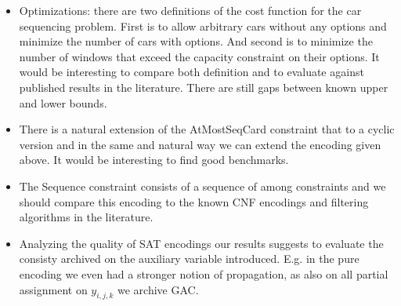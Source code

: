 \documentclass[]{llncs}
\newcommand{\AtMostSeqCard}{AtMostSeqCard }
\begin{document}
\begin{itemize}
    \item Optimizations: there are two definitions of the cost function
        for the car sequencing problem. First is to allow arbitrary cars
        without any options and minimize the number of cars with
        options. And second is to minimize the number of windows that
        exceed the capacity constraint on their options. It would be
        interesting to compare both definition and to evaluate against
        published results in the literature. There are still gaps
        between known upper and lower bounds. 
    \item There is a natural extension of the \AtMostSeqCard constraint
        that to a cyclic version and in the same and natural way we can
        extend the encoding given above. It would be interesting to find
        good benchmarks. 
    \item The Sequence constraint consists of a sequence of among
        constraints and we should compare this encoding to the known CNF
        encodings and filtering algorithms in the literature. 
    \item Analyzing the quality of SAT encodings our results suggests to
        evaluate the consisty archived on the auxiliary variable
        introduced. E.g. in the pure encoding we even had a
        stronger notion of propagation, as also on all partial
        assignment on $y_{i,j,k}$ we archive GAC. 
\end{itemize}



\end{document}
